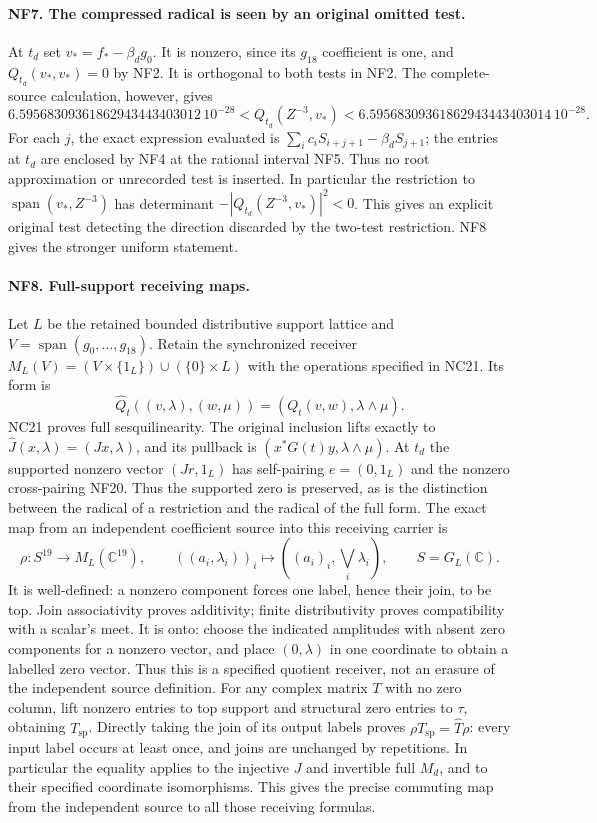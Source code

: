 \documentclass[11pt,a4paper]{article}
\theoremstyle{definition}\newtheorem{definition}[theorem]{Definition}
\begin{document}
\paragraph{NF7. The compressed radical is seen by an original omitted test.}
At $t_d$ set $v_*=f_*-\beta_dg_0$. It is nonzero, since its
$g_{18}$ coefficient is one, and $Q_{t_d}(v_*,v_*)=0$ by NF2.
It is orthogonal to both tests in NF2. The complete-source
calculation, however, gives
\[
 6.59568309361862943443403012\,10^{-28}
 <Q_{t_d}(Z^{-3},v_*)
 <6.59568309361862943443403014\,10^{-28}.
 \tag{NF20}
\]
For each $j$, the exact expression evaluated is
$\sum_i c_iS_{i+j+1}-\beta_dS_{j+1}$; the entries at $t_d$ are
enclosed by NF4 at the rational interval NF5. Thus no root
approximation or unrecorded test is inserted. In particular the
restriction to $\operatorname{span}(v_*,Z^{-3})$ has determinant
$-|Q_{t_d}(Z^{-3},v_*)|^2<0$. This gives an explicit original
test detecting the direction discarded by the two-test
restriction. NF8 gives the stronger uniform statement.

\paragraph{NF8. Full-support receiving maps.}
Let $L$ be the retained bounded distributive support lattice and
$V=\operatorname{span}(g_0,\ldots,g_{18})$. Retain the synchronized
receiver
$M_L(V)=(V\times\{1_L\})\cup(\{0\}\times L)$ with the
operations specified in NC21. Its form is
\[
 \widehat Q_t((v,\lambda),(w,\mu))
 =(Q_t(v,w),\lambda\wedge\mu).
 \tag{NF21}
\]
NC21 proves full sesquilinearity. The original inclusion lifts
exactly to $\widehat J(x,\lambda)=(Jx,\lambda)$, and its pullback
is $(x^*G(t)y,\lambda\wedge\mu)$. At $t_d$ the supported
nonzero vector $(Jr,1_L)$ has self-pairing $e=(0,1_L)$ and the
nonzero cross-pairing NF20. Thus the supported zero is preserved,
as is the distinction between the radical of a restriction and
the radical of the full form. The exact map from an independent
coefficient source into this receiving carrier is
\[
 \rho:S^{19}\longrightarrow M_L(\mathbb C^{19}),\qquad
 ((a_i,\lambda_i))_i\longmapsto
 ((a_i)_i,\bigvee_i\lambda_i),\qquad S=G_L(\mathbb C).
 \tag{NF22}
\]
It is well-defined: a nonzero component forces one label, hence
their join, to be top. Join associativity proves additivity;
finite distributivity proves compatibility with a scalar's meet.
It is onto: choose the indicated amplitudes with absent zero
components for a nonzero vector, and place $(0,\lambda)$ in one
coordinate to obtain a labelled zero vector. Thus this is a
specified quotient receiver, not an erasure of the independent
source definition. For any complex matrix $T$ with no zero column,
lift nonzero entries to top support and structural zero entries
to $\tau$, obtaining $T_{\mathrm{sp}}$. Directly taking the join
of its output labels proves
$\rho T_{\mathrm{sp}}=\widehat T\rho$:
every input label occurs at least once, and joins are unchanged
by repetitions. In particular the equality applies to the
injective $J$ and invertible full $M_d$, and to their specified
coordinate isomorphisms. This gives the precise commuting map
from the independent source to all those receiving formulas.
\end{document}
